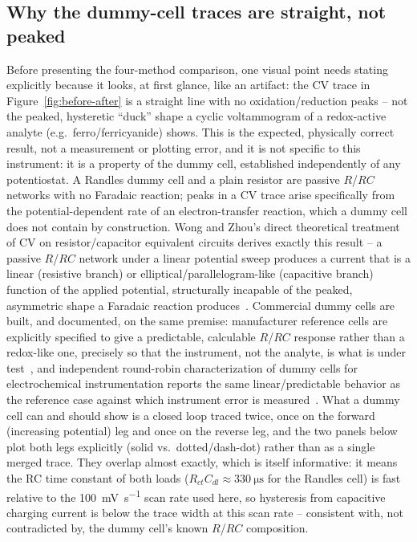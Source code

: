 \subsection{Why the dummy-cell traces are straight, not peaked}
Before presenting the four-method comparison, one visual point needs stating
explicitly because it looks, at first glance, like an artifact: the CV
trace in Figure~\ref{fig:before-after} is a straight line with no
oxidation/reduction peaks -- not the peaked, hysteretic ``duck'' shape a
cyclic voltammogram of a redox-active analyte (e.g.\ ferro/ferricyanide)
shows. This is the expected, physically correct result, not a
measurement or plotting error, and it is not specific to this instrument:
it is a property of the dummy cell, established independently of any
potentiostat. A Randles dummy cell and a plain resistor are passive
$R$/$RC$ networks with no Faradaic reaction; peaks in a CV trace arise
specifically from the potential-dependent rate of an electron-transfer
reaction, which a dummy cell does not contain by construction. Wong and
Zhou's direct theoretical treatment of CV on resistor/capacitor equivalent
circuits derives exactly this result -- a passive $R$/$RC$ network under a
linear potential sweep produces a current that is a linear (resistive
branch) or elliptical/parallelogram-like (capacitive branch) function of
the applied potential, structurally incapable of the peaked, asymmetric
shape a Faradaic reaction produces~\cite{wong2024cyclic}. Commercial dummy
cells are built, and documented, on the same premise: manufacturer
reference cells are explicitly specified to give a predictable, calculable
$R$/$RC$ response rather than a redox-like one, precisely so that the
instrument, not the analyte, is what is under test~\cite{gamry2011universal},
and independent round-robin characterization of dummy cells for
electrochemical instrumentation reports the same linear/predictable
behavior as the reference case against which instrument error is
measured~\cite{kasper2022electrochemical}. What a dummy cell can and should
show is a closed loop traced twice, once on the forward (increasing
potential) leg and once on the reverse leg, and the two panels below plot
both legs explicitly (solid vs.\ dotted/dash-dot) rather than as a single
merged trace. They overlap almost exactly, which is itself informative: it
means the RC time constant of both loads ($R_{ct}C_{dl}\approx
\SI{330}{\micro\second}$ for the Randles cell) is fast relative to the
\SI{100}{\milli\volt\per\second} scan rate used here, so hysteresis from
capacitive charging current is below the trace width at this scan rate --
consistent with, not contradicted by, the dummy cell's known $R$/$RC$
composition.

